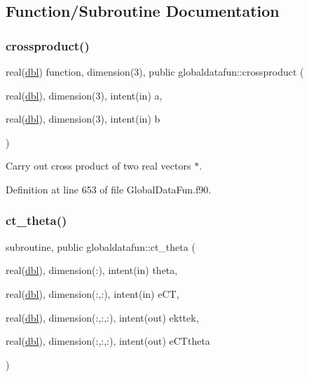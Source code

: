 \subsection{Function/\+Subroutine Documentation}
\mbox{\label{namespaceglobaldatafun_a5b4feec69bb3f3464bcd8c08406f9c82}} 
\subsubsection{\texorpdfstring{crossproduct()}{crossproduct()}}
{\footnotesize\ttfamily real(\hyperlink{namespaceglobaldatafun_a5008801201dd34f2af8eae07756befb4}{dbl}) function, dimension(3), public globaldatafun\+::crossproduct (\begin{DoxyParamCaption}\item[{real(\hyperlink{namespaceglobaldatafun_a5008801201dd34f2af8eae07756befb4}{dbl}), dimension(3), intent(in)}]{a,  }\item[{real(\hyperlink{namespaceglobaldatafun_a5008801201dd34f2af8eae07756befb4}{dbl}), dimension(3), intent(in)}]{b }\end{DoxyParamCaption})}



Carry out cross product of two real vectors $\ast$. 



Definition at line 653 of file Global\+Data\+Fun.\+f90.

\mbox{\label{namespaceglobaldatafun_a166b3774feeda05d1e3d1761c1412e85}} 
\subsubsection{\texorpdfstring{ct\+\_\+theta()}{ct\_theta()}}
{\footnotesize\ttfamily subroutine, public globaldatafun\+::ct\+\_\+theta (\begin{DoxyParamCaption}\item[{real(\hyperlink{namespaceglobaldatafun_a5008801201dd34f2af8eae07756befb4}{dbl}), dimension(\+:), intent(in)}]{theta,  }\item[{real(\hyperlink{namespaceglobaldatafun_a5008801201dd34f2af8eae07756befb4}{dbl}), dimension(\+:,\+:), intent(in)}]{e\+CT,  }\item[{real(\hyperlink{namespaceglobaldatafun_a5008801201dd34f2af8eae07756befb4}{dbl}), dimension(\+:,\+:,\+:), intent(out)}]{ekttek,  }\item[{real(\hyperlink{namespaceglobaldatafun_a5008801201dd34f2af8eae07756befb4}{dbl}), dimension(\+:,\+:,\+:), intent(out)}]{e\+C\+Ttheta }\end{DoxyParamCaption})}



